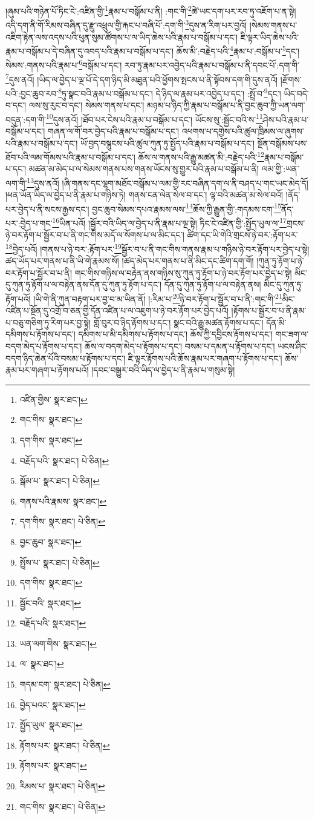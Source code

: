 །ཞུམ་པའི་གཉེན་པོ་ཏིང་ངེ་:འཛིན་གྱི་\footnote{འཛིན་གྱིས་  སྣར་ཐང་། }རྣམ་པ་བསྒོམ་པ་ནི། :གང་གི་\footnote{གང་གིས་  སྣར་ཐང་། }ཚེ་ཡང་དག་པར་རབ་ཏུ་འཇོག་པ་ན་སྟེ། འདི་དག་ནི་གོ་རིམས་བཞིན་དུ་རྫུ་འཕྲུལ་གྱི་རྐང་པ་བཞི་པོ་:དག་གི་\footnote{དག་གིས་  སྣར་ཐང་། }དུས་ན་རིག་པར་བྱའོ། །སེམས་གནས་པ་འཇིག་རྟེན་ལས་འདས་པའི་ཕུན་སུམ་ཚོགས་པ་ལ་ཡིད་ཆེས་པའི་རྣམ་པ་བསྒོམ་པ་དང་། ཇི་ལྟར་ཡིད་ཆེས་པའི་རྣམ་པ་བསྒོམ་པ་དེ་བཞིན་དུ་འབད་པའི་རྣམ་པ་བསྒོམ་པ་དང་། ཆོས་མི་:བརྗེད་པའི་\footnote{བརྗོད་པའི་  སྣར་ཐང་།  པེ་ཅིན། }རྣམ་པ་:བསྒོམ་པ་\footnote{སྒོམ་པ་  སྣར་ཐང་།  པེ་ཅིན། }དང་། སེམས་:གནས་པའི་རྣམ་པ་\footnote{གནས་པའི་རྣམས་  སྣར་ཐང་། }བསྒོམ་པ་དང་། རབ་ཏུ་རྣམ་པར་འབྱེད་པའི་རྣམ་པ་བསྒོམ་པ་ནི་དབང་པོ་:དག་གི་\footnote{དག་གིས་  སྣར་ཐང་།  པེ་ཅིན། }དུས་ནའོ། །ཡིད་ལ་བྱེད་པ་ལྔ་པོ་དེ་དག་ཉིད་མི་མཐུན་པའི་ཕྱོགས་སྤངས་པ་ནི་སྟོབས་དག་གི་དུས་ནའོ། །རྫོགས་པའི་:བྱང་ཆུབ་རབ་\footnote{བྱང་ཆུབ་  སྣར་ཐང་། }ཏུ་སྣང་བའི་རྣམ་པ་བསྒོམ་པ་དང་། དེ་ཉིད་ལ་རྣམ་པར་འབྱེད་པ་དང་། :སྤྲོ་བ་\footnote{སྤྲོས་པ་  སྣར་ཐང་།  པེ་ཅིན། }དང་། ཡིད་བདེ་བ་དང་། ལས་སུ་རུང་བ་དང་། སེམས་གནས་པ་དང་། མཉམ་པ་ཉིད་ཀྱི་རྣམ་པ་བསྒོམ་པ་ནི་བྱང་ཆུབ་ཀྱི་ཡན་ལག་བདུན་:དག་གི་\footnote{དག་གིས་  སྣར་ཐང་། }དུས་ནའོ། །ཐོབ་པར་ངེས་པའི་རྣམ་པ་བསྒོམ་པ་དང་། ཡོངས་སུ་:སྦྱོང་བའི་ས་\footnote{སྦྱོང་བའི་  སྣར་ཐང་། }ཤེས་པའི་རྣམ་པ་བསྒོམ་པ་དང་། གཞན་ལ་གོ་བར་བྱེད་པའི་རྣམ་པ་བསྒོམ་པ་དང་། འཕགས་པ་དགྱེས་པའི་ཚུལ་ཁྲིམས་ལ་ཞུགས་པའི་རྣམ་པ་བསྒོམ་པ་དང་། ཡོ་བྱད་བསྙུངས་པའི་ཚུལ་ཀུན་ཏུ་སྤྱོད་པའི་རྣམ་པ་བསྒོམ་པ་དང་། སྔོན་བསྒོམས་པས་ཐོབ་པའི་ལམ་གོམས་པའི་རྣམ་པ་བསྒོམ་པ་དང་། ཆོས་ལ་གནས་པའི་རྒྱུ་མཚན་མི་:བརྗེད་པའི་\footnote{བརྗོད་པའི་  སྣར་ཐང་། }རྣམ་པ་བསྒོམ་པ་དང་། མཚན་མ་མེད་པ་ལ་སེམས་གནས་པས་གནས་ཡོངས་སུ་གྱུར་པའི་རྣམ་པ་བསྒོམ་པ་ནི། ལམ་གྱི་:ཡན་ལག་གི་\footnote{ཡན་ལག་གིས་  སྣར་ཐང་། }དུས་ནའོ། །ཞི་གནས་དང་ལྷག་མཐོང་བསྒོམ་པ་ལམ་གྱི་རང་བཞིན་དག་ལ་ནི་བཤད་པ་གང་ཡང་མེད་དོ། །ཕན་ཡོན་ཡིད་ལ་བྱེད་པ་ནི་རྣམ་པ་གཉིས་ཏེ། གནས་ངན་ལེན་སེལ་བ་དང་། ལྟ་བའི་མཚན་མ་སེལ་བའོ། །ནོད་པར་བྱེད་པ་ནི་སངས་རྒྱས་དང་། བྱང་ཆུབ་སེམས་དཔའ་རྣམས་ལས་\footnote{ལ་  སྣར་ཐང་། }ཆོས་ཀྱི་རྒྱུན་གྱི་:གདམས་ངག་\footnote{གདམ་ངག་  སྣར་ཐང་།  པེ་ཅིན། }ནོད་པར་:བྱེད་པ་གང་\footnote{བྱེད་པའང་  སྣར་ཐང་། }ཡིན་པའོ། །སྦྱོར་བའི་ཡིད་ལ་བྱེད་པ་ནི་རྣམ་པ་ལྔ་སྟེ། ཏིང་ངེ་འཛིན་གྱི་:སྤྱོད་ཡུལ་ལ་\footnote{སྤྱོད་ཡུལ་  སྣར་ཐང་། }གྲངས་ཉེ་བར་རྟོག་པ་སྦྱོར་བ་པ་ནི་གང་གིས་མདོ་ལ་སོགས་པ་ལ་མིང་དང་། ཚིག་དང་ཡི་གེའི་གྲངས་ཉེ་བར་:རྟོག་པར་\footnote{རྟོགས་པར་  སྣར་ཐང་།  པེ་ཅིན། }བྱེད་པའོ། །གནས་པ་ཉེ་བར་:རྟོག་པར་\footnote{རྟོགས་པར་  སྣར་ཐང་། }སྦྱོར་བ་པ་ནི་གང་གིས་གནས་རྣམ་པ་གཉིས་ཉེ་བར་རྟོག་པར་བྱེད་པ་སྟེ། ཚད་ཡོད་པར་གནས་པ་ནི་ཡི་གེ་རྣམས་སོ། །ཚད་མེད་པར་གནས་པ་ནི་མིང་དང་ཚིག་དག་གོ། །ཀུན་ཏུ་རྟོག་པ་ཉེ་བར་རྟོག་པ་སྦྱོར་བ་པ་ནི། གང་གིས་གཉིས་ལ་བརྟེན་ནས་གཉིས་སུ་ཀུན་ཏུ་རྟོག་པ་ཉེ་བར་རྟོག་པར་བྱེད་པ་སྟེ། མིང་དུ་ཀུན་ཏུ་རྟོག་པ་ལ་བརྟེན་ནས་དོན་དུ་ཀུན་ཏུ་རྟོག་པ་དང་། དོན་དུ་ཀུན་ཏུ་རྟོག་པ་ལ་བརྟེན་ནས། མིང་དུ་ཀུན་ཏུ་རྟོག་པའོ། །ཡི་གེ་ནི་ཀུན་བརྟག་པར་བྱ་བ་མ་ཡིན་ནོ། །:རིམ་པ་\footnote{རིམས་པ་  སྣར་ཐང་།  པེ་ཅིན། }ཉེ་བར་རྟོག་པ་སྦྱོར་བ་པ་ནི་:གང་གི་\footnote{གང་གིས་  སྣར་ཐང་།  པེ་ཅིན། }མིང་འཛིན་པ་སྔོན་དུ་འགྲོ་བ་ཅན་གྱི་དོན་འཛིན་པ་ལ་འཇུག་པ་ཉེ་བར་རྟོག་པར་བྱེད་པའོ། །རྟོགས་པ་སྦྱོར་བ་པ་ནི་རྣམ་པ་བཅུ་གཅིག་ཏུ་རིག་པར་བྱ་སྟེ། གློ་བུར་བ་ཉིད་རྟོགས་པ་དང་། སྣང་བའི་རྒྱུ་མཚན་རྟོགས་པ་དང་། དོན་མི་དམིགས་པ་རྟོགས་པ་དང་། དམིགས་པ་མི་དམིགས་པ་རྟོགས་པ་དང་། ཆོས་ཀྱི་དབྱིངས་རྟོགས་པ་དང་། གང་ཟག་ལ་བདག་མེད་པ་རྟོགས་པ་དང་། ཆོས་ལ་བདག་མེད་པ་རྟོགས་པ་དང་། བསམ་པ་དམན་པ་རྟོགས་པ་དང་། ཡངས་ཤིང་བདག་ཉིད་ཆེན་པོའི་བསམ་པ་རྟོགས་པ་དང་། ཇི་ལྟར་རྟོགས་པའི་ཆོས་རྣམ་པར་གཞག་པ་རྟོགས་པ་དང་། ཆོས་རྣམ་པར་གཞག་པ་རྟོགས་པའོ། །དབང་བསྒྱུར་བའི་ཡིད་ལ་བྱེད་པ་ནི་རྣམ་པ་གསུམ་སྟེ། 